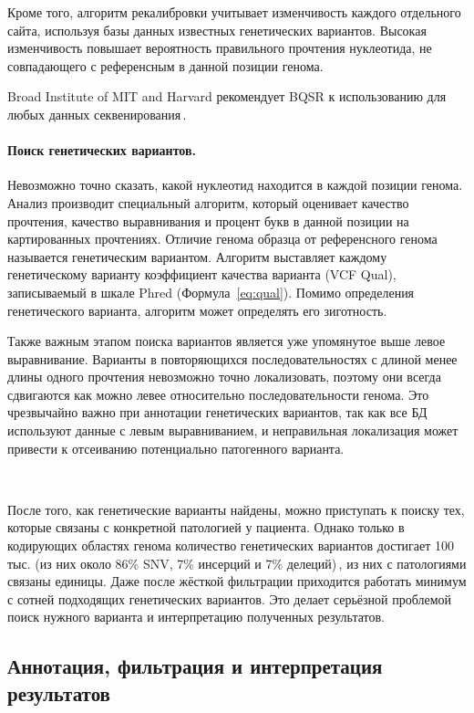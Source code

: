 \documentclass[a4paper,14pt]{extarticle}
\newcommand{\formula}[1]{Формула~\ref{#1}}
\begin{document}
Кроме того, алгоритм рекалибровки учитывает изменчивость каждого отдельного сайта, используя базы данных известных генетических вариантов.
Высокая изменчивость повышает вероятность правильного прочтения нуклеотида, не совпадающего с референсным в данной позиции генома.

Broad Institute of MIT and Harvard рекомендует BQSR к использованию для любых данных секвенирования\,\cite{Auwera_2013}.

\paragraph{Поиск генетических вариантов.}
Невозможно точно сказать, какой нуклеотид находится в каждой позиции генома.
Анализ производит специальный алгоритм, который оценивает качество прочтения, качество выравнивания и процент букв в данной позиции на картированных прочтениях.
Отличие генома образца от референсного генома называется генетическим вариантом.
Алгоритм выставляет каждому генетическому варианту коэффициент качества варианта (VCF Qual), записываемый в шкале Phred (\formula{eq:qual}).
Помимо определения генетического варианта, алгоритм может определять его зиготность.

Также важным этапом поиска вариантов является уже упомянутое выше левое выравнивание.
Варианты в повторяющихся последовательностях с длиной менее длины одного прочтения невозможно точно локализовать, поэтому они всегда сдвигаются как можно левее относительно последовательности генома.
Это чрезвычайно важно при аннотации генетических вариантов, так как все БД используют данные с левым выравниванием, и неправильная локализация может привести к отсеиванию потенциально патогенного варианта.

~

После того, как генетические варианты найдены, можно приступать к поиску тех, которые связаны с конкретной патологией у пациента.
Однако только в кодирующих областях генома количество генетических вариантов достигает 100 тыс. (из них около 86\% SNV, 7\% инсерций и 7\% делеций)\,\cite{Supernat_2018}, из них с патологиями связаны единицы.
Даже после жёсткой фильтрации приходится работать минимум с сотней подходящих генетических вариантов.
Это делает серьёзной проблемой поиск нужного варианта и интерпретацию полученных результатов.

\subsection{Аннотация, фильтрация и интерпретация результатов}
\end{document}
